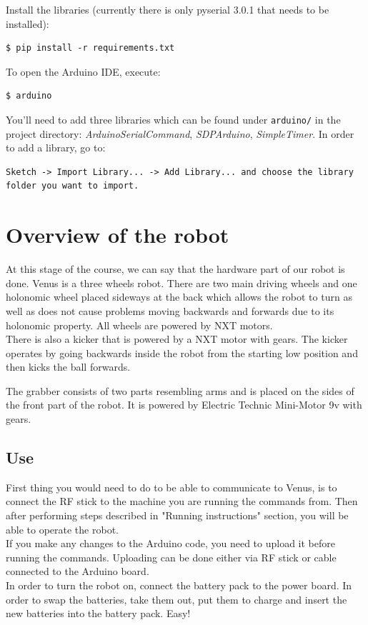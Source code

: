 \documentclass[12pt]{article}
\begin{document}
Install the libraries (currently there is only pyserial 3.0.1 that needs to be installed):
\begin{lstlisting}
$ pip install -r requirements.txt
\end{lstlisting}

To open the Arduino IDE, execute:
\begin{lstlisting}
$ arduino
\end{lstlisting}

You'll need to add three libraries which can be found under \texttt{arduino/} in the project directory: \textit{ArduinoSerialCommand}, \textit{SDPArduino}, \textit{SimpleTimer}. In order to add a library, go to:
\begin{lstlisting}
Sketch -> Import Library... -> Add Library... and choose the library folder you want to import.
\end{lstlisting}

\section{Overview of the robot}

At this stage of the course, we can say that the hardware part of our robot is done. Venus is a three wheels robot. There are two main driving wheels and one holonomic wheel placed sideways at the back which allows the robot to turn as well as does not cause problems moving backwards and forwards due to its holonomic property. All wheels are powered by NXT motors. 
\\There is also a kicker that is powered by a NXT motor with gears. The kicker operates by going backwards inside the robot from the starting low position and then kicks the ball forwards.

The grabber consists of two parts resembling arms and is placed on the sides of the front part of the robot. It is powered by Electric Technic Mini-Motor 9v with gears. 

\subsection{Use}

First thing you would need to do to be able to communicate to Venus, is to connect the RF stick to the machine you are running the commands from. Then after performing steps described in "Running instructions" section, you will be able to operate the robot.
\\If you make any changes to the Arduino code, you need to upload it before running the commands. Uploading can be done either via RF stick or cable connected to the Arduino board. 
\\In order to turn the robot on, connect the battery pack to the power board.
In order to swap the batteries, take them out, put them to charge and insert
the new batteries into the battery pack. Easy!
\end{document}
